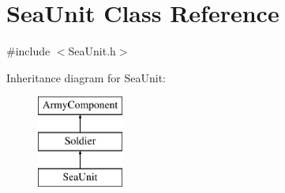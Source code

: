 \hypertarget{class_sea_unit}{}\section{Sea\+Unit Class Reference}
\label{class_sea_unit}


{\ttfamily \#include $<$Sea\+Unit.\+h$>$}

Inheritance diagram for Sea\+Unit\+:\begin{figure}[H]
\begin{center}
\leavevmode
\includegraphics[height=3.000000cm]{class_sea_unit}
\end{center}
\end{figure}
